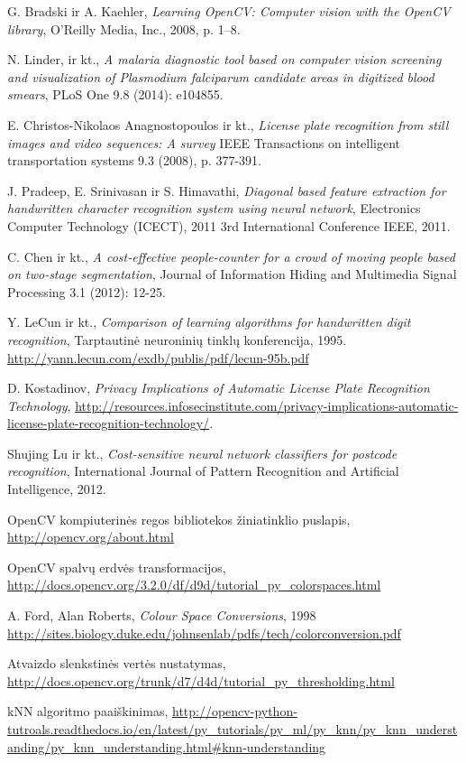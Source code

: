 \documentclass[a4paper,12pt]{article}
\begin{document}
 
\begin{thebibliography}{99}
G. Bradski ir A. Kaehler, \textit{Learning OpenCV: Computer vision with the OpenCV library}, O'Reilly Media, Inc., 2008, p. 1–8.

N. Linder, ir kt., \textit{A malaria diagnostic tool based on computer vision screening and visualization of Plasmodium falciparum candidate areas in digitized blood smears}, PLoS One 9.8 (2014): e104855.

E. Christos-Nikolaos Anagnostopoulos ir kt., \textit{License plate recognition from still images and video sequences: A survey} IEEE Transactions on intelligent transportation systems 9.3 (2008), p. 377-391.

J. Pradeep, E. Srinivasan ir S. Himavathi, \textit{Diagonal based feature extraction for handwritten character recognition system using neural network}, Electronics Computer Technology (ICECT), 2011 3rd International Conference IEEE, 2011.

C. Chen ir kt., \textit{A cost-effective people-counter for a crowd of moving people based on two-stage segmentation}, Journal of Information Hiding and Multimedia Signal Processing 3.1 (2012): 12-25.
 
Y. LeCun ir kt., \textit{Comparison of learning algorithms for handwritten digit recognition}, Tarptautinė neuroninių tinklų konferencija, 1995.
\url{http://yann.lecun.com/exdb/publis/pdf/lecun-95b.pdf}

D. Kostadinov, \textit{Privacy Implications of Automatic License Plate Recognition Technology}, \url{http://resources.infosecinstitute.com/privacy-implications-automatic-license-plate-recognition-technology/}.

 Shujing Lu ir kt., \textit{Cost-sensitive neural network classifiers for postcode recognition}, International Journal of Pattern Recognition and Artificial Intelligence, 2012.
 
OpenCV kompiuterinės regos bibliotekos žiniatinklio puslapis, \url{http://opencv.org/about.html}

OpenCV spalvų erdvės transformacijos, \url{http://docs.opencv.org/3.2.0/df/d9d/tutorial_py_colorspaces.html}

A. Ford, Alan Roberts, \textit{Colour Space Conversions}, 1998
\url{http://sites.biology.duke.edu/johnsenlab/pdfs/tech/colorconversion.pdf}

Atvaizdo slenkstinės vertės nustatymas, \url{http://docs.opencv.org/trunk/d7/d4d/tutorial_py_thresholding.html}

kNN algoritmo paaiškinimas, \url{http://opencv-python-tutroals.readthedocs.io/en/latest/py_tutorials/py_ml/py_knn/py_knn_understanding/py_knn_understanding.html#knn-understanding}


\end{thebibliography} 
 
\end{document}

